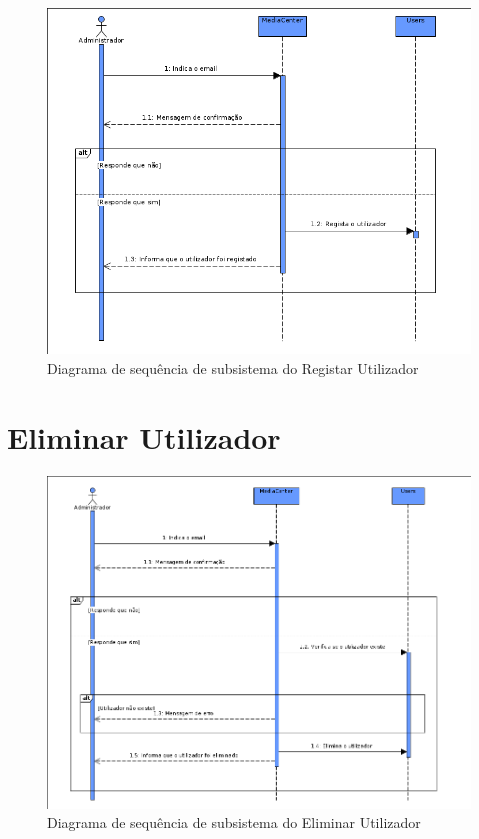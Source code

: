 \documentclass[a4paper]{report}
\begin{document}
\begin{figure}[H]
	\centering 
    \includegraphics[width=\textwidth]{images/reguserSub.png}  
    \caption{Diagrama de sequência de subsistema do Registar Utilizador}
\end{figure}

\section{Eliminar Utilizador}

\begin{figure}[H]
	\centering 
    \includegraphics[width=\textwidth]{images/elemuserSub.png}  
    \caption{Diagrama de sequência de subsistema do Eliminar Utilizador}
\end{figure}
\end{document}
